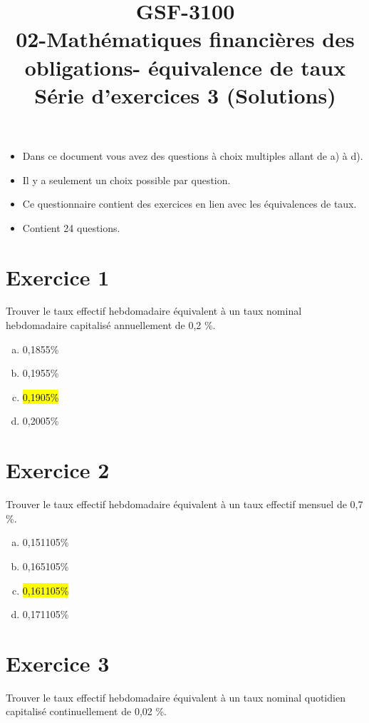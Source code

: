 \documentclass[10pt,a4paper]{article}
\title{GSF-3100 \\
02-Mathématiques financières des obligations- équivalence de taux \\
Série d'exercices 3 (Solutions)}
\begin{document}
\maketitle

\begin{itemize}
\item Dans ce document vous avez des questions à choix multiples allant de a) à d).  
\item Il y a seulement un choix possible par question.
\item Ce questionnaire contient des exercices en lien avec les équivalences de taux.
\item Contient 24 questions. 
\end{itemize}
 





\newpage

\section*{Exercice 1}
Trouver le taux effectif hebdomadaire équivalent à un taux nominal hebdomadaire capitalisé annuellement de 0,2 \%.


\begin{enumerate}[a)]
\item 0,1855\%
\item 0,1955\%
\item \hl{0,1905\%}
\item 0,2005\%
\end{enumerate}

\section*{Exercice 2}
Trouver le taux effectif hebdomadaire équivalent à un taux effectif mensuel de 0,7 \%.


\begin{enumerate}[a)]
\item 0,151105\%
\item 0,165105\%
\item \hl{0,161105\%}
\item 0,171105\%
\end{enumerate}

\section*{Exercice 3}
Trouver le taux effectif hebdomadaire équivalent à un taux nominal quotidien capitalisé continuellement de 0,02 \%.
\end{document}
